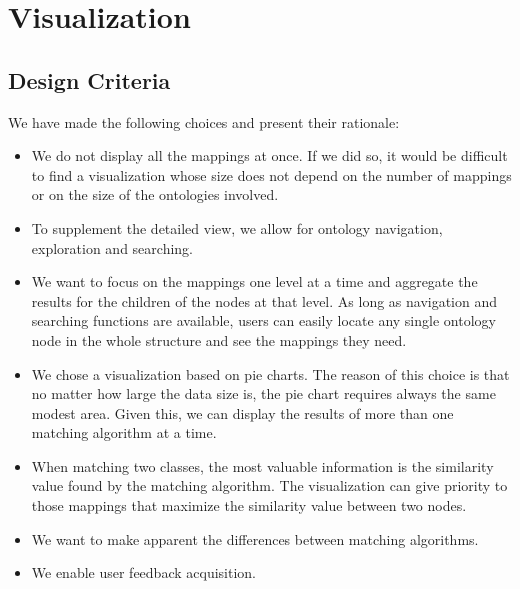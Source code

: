 \chapter{Visualization}

\section{Design Criteria} %
\label{sub:prototype}

We have made the following choices and present their
rationale:

\begin{itemize}
  \item We do not display all the mappings at once. If we did so, it
    would be difficult to find a visualization whose size does not
    depend on the number of mappings or on the size of the ontologies
    involved.
  \item To supplement the detailed view, we allow for ontology navigation, exploration and searching.
\item We want to focus on the mappings one level at a time and
  aggregate the results for the children of the nodes at that level. As long as navigation and searching functions are available, users can easily locate any single ontology node in the whole structure and see the mappings they need.
\item We chose a visualization based on pie charts. The reason of this
  choice is that
no matter how large the data size is, the pie chart requires always
the same modest area. Given this, we can display the results of more
than one matching algorithm at a time.
\item When matching two classes, the most valuable information is the
  similarity value found by the matching algorithm. The visualization
  can give priority to those mappings that maximize the similarity
  value between two nodes.
\item We want to make apparent the differences between matching
  algorithms.
\item We enable user feedback acquisition.
\end{itemize}

